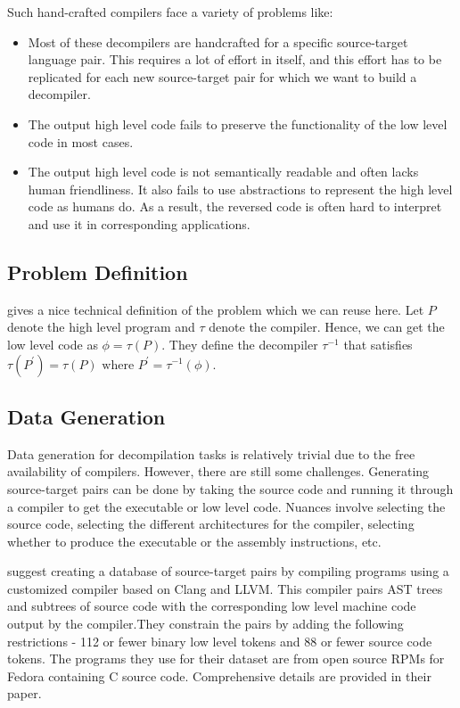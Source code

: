 \documentclass{article}
\begin{document}
Such hand-crafted compilers face a variety of problems like:
\begin{itemize}
    \item Most of these decompilers are handcrafted for a specific source-target language pair. This requires a lot of effort in itself, and this effort has to be replicated for each new source-target pair for which we want to build a decompiler.
    \item The output high level code fails to preserve the functionality of the low level code in most cases.
    \item The output high level code is not semantically readable and often lacks human friendliness. It also fails to use abstractions to represent the high level code as humans do. As a result, the reversed code is often hard to interpret and use it in corresponding applications.
\end{itemize}

\subsection{Problem Definition}
\citet{coda} gives a nice technical definition of the problem which we can reuse here. Let $P$ denote the high level program and $\tau$ denote the compiler. Hence, we can get the low level code as $\phi = \tau(P)$. They define the decompiler $\tau^{-1}$ that satisfies $\tau(P^{'}) = \tau(P) \text{ where } P^{'} = \tau^{-1}(\phi)$.

\subsection{Data Generation}
Data generation for decompilation tasks is relatively trivial due to the free availability of compilers. However, there are still some challenges. Generating source-target pairs can be done by taking the source code and running it through a compiler to get the executable or low level code. Nuances involve selecting the source code, selecting the different architectures for the compiler, selecting whether to produce the executable or the assembly instructions, etc. 

\citet{katz2018using} suggest creating a database of source-target pairs by compiling programs using a customized compiler based on Clang and LLVM. This compiler pairs AST trees and subtrees of source code with the corresponding low level machine code output by the compiler.They constrain the pairs by adding the following restrictions - 112 or fewer binary low level tokens and 88 or fewer source code tokens. The programs they use for their dataset are from open source RPMs for Fedora containing C source code. Comprehensive details are provided in their paper.
\end{document}
